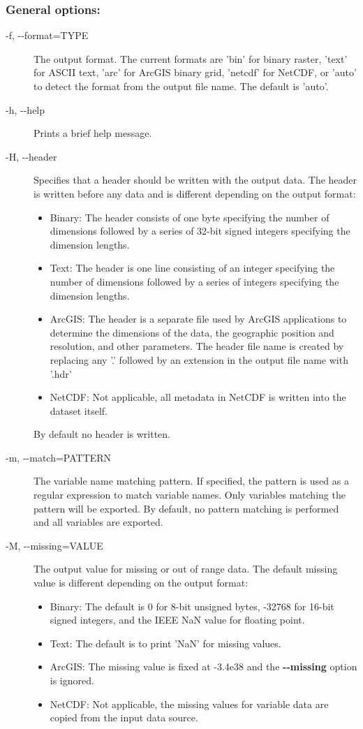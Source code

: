 \subsubsection*{General options:}
\begin{description}
\item[ -f, -{-}format=TYPE ] The output format. The current formats are 'bin' for binary raster, 'text' for ASCII text, 'arc' for ArcGIS binary grid, 'netcdf' for NetCDF, or 'auto' to detect the format from the output file name. The default is 'auto'.
\item[ -h, -{-}help ] Prints a brief help message. 
\item[ -H, -{-}header ] Specifies that a header should be written with the output data. The header is written before any data and is different depending on the output format: \begin{itemize}
\item Binary: The header consists of one byte specifying the number of dimensions followed by a series of 32-bit signed integers specifying the dimension lengths.
\item Text: The header is one line consisting of an integer specifying the number of dimensions followed by a series of integers specifying the dimension lengths.
\item ArcGIS: The header is a separate file used by ArcGIS applications to determine the dimensions of the data, the geographic position and resolution, and other parameters. The header file name is created by replacing any '.' followed by an extension in the output file name with '.hdr'
\item NetCDF: Not applicable, all metadata in NetCDF is written into the dataset itself.

\end{itemize}
 By default no header is written. 
\item[ -m, -{-}match=PATTERN ] The variable name matching pattern. If specified, the pattern is used as a regular expression to match variable names. Only variables matching the pattern will be exported. By default, no pattern matching is performed and all variables are exported. 
\item[ -M, -{-}missing=VALUE ] The output value for missing or out of range data. The default missing value is different depending on the output format: \begin{itemize}
\item Binary: The default is 0 for 8-bit unsigned bytes, -32768 for 16-bit signed integers, and the IEEE NaN value for floating point.
\item Text: The default is to print 'NaN' for missing values.
\item ArcGIS: The missing value is fixed at -3.4e38 and the \textbf{-{-}missing}
 option is ignored.
\item NetCDF: Not applicable, the missing values for variable data are copied from the input data source.


\end{itemize}
\end{description}
